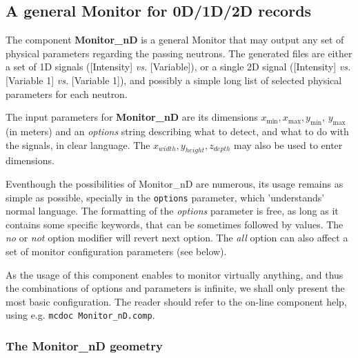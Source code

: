 \subsection*{A general Monitor for 0D/1D/2D records}
\label{s:monitornd}


The component \textbf{Monitor\_nD} is a general Monitor that may output any
set of physical parameters regarding the passing neutrons. The
generated files are either a set of 1D signals ([Intensity] \textit{vs.}
[Variable]), or a single 2D signal ([Intensity] \textit{vs.} [Variable 1]
\textit{vs.} [Variable 1]), and possibly a simple long list of selected
physical parameters for each neutron.

The input parameters for \textbf{Monitor\_nD} are its dimensions $x_\textrm{
  min}, x_\textrm{max}, y_\textrm{min}$, $y_\textrm{max}$ (in meters) and an \textit{
  options} string describing what to detect, and what to do with the
signals, in clear language. The $x_{width}, y_{height}, z_{depth}$ may also be used to enter dimensions.

Eventhough the possibilities of Monitor\_nD are numerous, its usage remains as simple as possible, specially in the \verb+options+ parameter, which 'understands' normal language.
The formatting of the \textit{options}
parameter is free, as long as it contains some specific keywords, that
can be sometimes followed by values. The \textit{no} or \textit{not} option
modifier will revert next option. The \textit{all} option can also affect a
set of monitor configuration parameters (see below).

As the usage of this component enables to monitor virtually anything, and thus the combinations of options and parameters is infinite, we shall only present the most basic configuration. The reader should refer to the on-line component help, using e.g. \verb+mcdoc Monitor_nD.comp+.

\subsubsection{The Monitor\_nD geometry}

